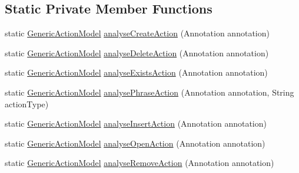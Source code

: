 \subsection*{Static Private Member Functions}
\begin{DoxyCompactItemize}
\item 
static \hyperlink{interfacecom_1_1poly_1_1nlp_1_1filekommander_1_1views_1_1models_1_1_generic_action_model}{Generic\-Action\-Model} \hyperlink{classcom_1_1poly_1_1nlp_1_1filekommander_1_1file_1_1actions_1_1_analyse_action_a62e07128db9a8df65417a02d84068e01}{analyse\-Create\-Action} (Annotation annotation)
\item 
static \hyperlink{interfacecom_1_1poly_1_1nlp_1_1filekommander_1_1views_1_1models_1_1_generic_action_model}{Generic\-Action\-Model} \hyperlink{classcom_1_1poly_1_1nlp_1_1filekommander_1_1file_1_1actions_1_1_analyse_action_a9970d61dcf513507ed64217bd16838ab}{analyse\-Delete\-Action} (Annotation annotation)
\item 
static \hyperlink{interfacecom_1_1poly_1_1nlp_1_1filekommander_1_1views_1_1models_1_1_generic_action_model}{Generic\-Action\-Model} \hyperlink{classcom_1_1poly_1_1nlp_1_1filekommander_1_1file_1_1actions_1_1_analyse_action_a683b8ce8891c552588d2247fbd9f4328}{analyse\-Exists\-Action} (Annotation annotation)
\item 
static \hyperlink{interfacecom_1_1poly_1_1nlp_1_1filekommander_1_1views_1_1models_1_1_generic_action_model}{Generic\-Action\-Model} \hyperlink{classcom_1_1poly_1_1nlp_1_1filekommander_1_1file_1_1actions_1_1_analyse_action_aa9896688bb8b9d517ff050315835804b}{analyse\-Phrase\-Action} (Annotation annotation, String action\-Type)
\item 
static \hyperlink{interfacecom_1_1poly_1_1nlp_1_1filekommander_1_1views_1_1models_1_1_generic_action_model}{Generic\-Action\-Model} \hyperlink{classcom_1_1poly_1_1nlp_1_1filekommander_1_1file_1_1actions_1_1_analyse_action_a75f845c14e6046304b2ad4ac56d0f56f}{analyse\-Insert\-Action} (Annotation annotation)
\item 
static \hyperlink{interfacecom_1_1poly_1_1nlp_1_1filekommander_1_1views_1_1models_1_1_generic_action_model}{Generic\-Action\-Model} \hyperlink{classcom_1_1poly_1_1nlp_1_1filekommander_1_1file_1_1actions_1_1_analyse_action_a4da9b25dc9bdae9570ef0459276548ad}{analyse\-Open\-Action} (Annotation annotation)
\item 
static \hyperlink{interfacecom_1_1poly_1_1nlp_1_1filekommander_1_1views_1_1models_1_1_generic_action_model}{Generic\-Action\-Model} \hyperlink{classcom_1_1poly_1_1nlp_1_1filekommander_1_1file_1_1actions_1_1_analyse_action_aea934abe03154ab654a156add6133093}{analyse\-Remove\-Action} (Annotation annotation)

\end{DoxyCompactItemize}
